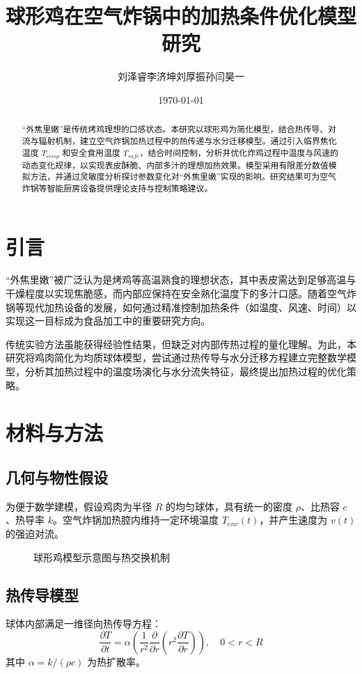 \documentclass[12pt]{article}
\title{球形鸡在空气炸锅中的加热条件优化模型研究}
\author{刘泽睿\quad 李济坤\quad 刘厚振\quad 孙闫昊一}
\date{\today}
\begin{document}
\maketitle

\begin{abstract}
“外焦里嫩”是传统烤鸡理想的口感状态。本研究以球形鸡为简化模型，结合热传导、对流与辐射机制，建立空气炸锅加热过程中的热传递与水分迁移模型。通过引入临界焦化温度 $T_{crisp}$ 和安全食用温度 $T_{safe}$，结合时间控制，分析并优化炸鸡过程中温度与风速的动态变化规律，以实现表皮酥脆、内部多汁的理想加热效果。模型采用有限差分数值模拟方法，并通过灵敏度分析探讨参数变化对“外焦里嫩”实现的影响。研究结果可为空气炸锅等智能厨房设备提供理论支持与控制策略建议。
\end{abstract}

\section{引言}
“外焦里嫩”被广泛认为是烤鸡等高温熟食的理想状态，其中表皮需达到足够高温与干燥程度以实现焦脆感，而内部应保持在安全熟化温度下的多汁口感。随着空气炸锅等现代加热设备的发展，如何通过精准控制加热条件（如温度、风速、时间）以实现这一目标成为食品加工中的重要研究方向。

传统实验方法虽能获得经验性结果，但缺乏对内部传热过程的量化理解。为此，本研究将鸡肉简化为均质球体模型，尝试通过热传导与水分迁移方程建立完整数学模型，分析其加热过程中的温度场演化与水分流失特征，最终提出加热过程的优化策略。

\section{材料与方法}

\subsection{几何与物性假设}
为便于数学建模，假设鸡肉为半径 $R$ 的均匀球体，具有统一的密度 $\rho$、比热容 $c$、热导率 $k$。空气炸锅加热腔内维持一定环境温度 $T_{env}(t)$，并产生速度为 $v(t)$ 的强迫对流。

\begin{figure}[htbp]
\centering
\caption{球形鸡模型示意图与热交换机制}
\label{fig:model}
\end{figure}

\subsection{热传导模型}
球体内部满足一维径向热传导方程：
\begin{equation}
\frac{\partial T}{\partial t} = \alpha \left( \frac{1}{r^2} \frac{\partial}{\partial r}\left(r^2 \frac{\partial T}{\partial r} \right) \right), \quad 0 < r < R
\end{equation}
其中 $\alpha = k/(\rho c)$ 为热扩散率。
\end{document}
